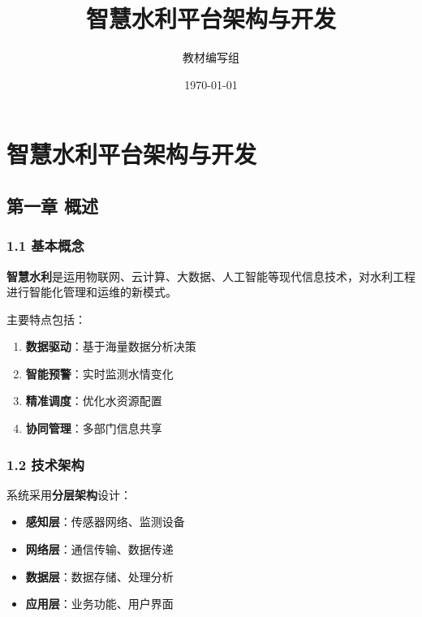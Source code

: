 \documentclass[UTF8,12pt,a4paper,oneside]{ctexbook}
\title{\textbf{智慧水利平台架构与开发}}
\author{教材编写组}
\date{\today}
\begin{document}
\maketitle
\newpage

\tableofcontents
\newpage

\section{智慧水利平台架构与开发}\label{ux667aux6167ux6c34ux5229ux5e73ux53f0ux67b6ux6784ux4e0eux5f00ux53d1}

\subsection{第一章 概述}\label{ux7b2cux4e00ux7ae0-ux6982ux8ff0}

\subsubsection{1.1 基本概念}\label{ux57faux672cux6982ux5ff5}

\textbf{智慧水利}是运用物联网、云计算、大数据、人工智能等现代信息技术，对水利工程进行智能化管理和运维的新模式。

主要特点包括：

\begin{enumerate}
\def\labelenumi{\arabic{enumi}.}
\tightlist
\item
  \textbf{数据驱动}：基于海量数据分析决策
\item
  \textbf{智能预警}：实时监测水情变化
\item
  \textbf{精准调度}：优化水资源配置
\item
  \textbf{协同管理}：多部门信息共享
\end{enumerate}

\subsubsection{1.2 技术架构}\label{ux6280ux672fux67b6ux6784}

系统采用\textbf{分层架构}设计：

\begin{itemize}
\tightlist
\item
  \textbf{感知层}：传感器网络、监测设备
\item
  \textbf{网络层}：通信传输、数据传递\\
\item
  \textbf{数据层}：数据存储、处理分析
\item
  \textbf{应用层}：业务功能、用户界面
\end{itemize}
\end{document}
